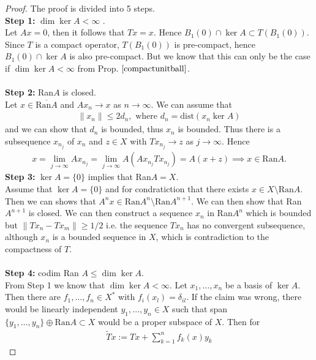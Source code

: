 \documentclass[11pt,a4paper]{article}
\theoremstyle{definition}
\begin{document}
\begin{proof}
The proof is divided into 5 steps. 
\\
\textbf{Step 1:} $\dim \ker A < \infty$ . \\
Let $Ax=0$, then it follows that $Tx=x$. Hence $B_1(0) \cap \ker A \subset T(B_1(0))$. Since $T$ is a compact operator, $T(B_1(0))$ is pre-compact, hence $B_1(0) \cap \ker A$ is also pre-compact. But we know that this can only be the case if $\dim \ker A < \infty$ from Prop. $\ref{compactunitball}$. 
\\\\
\textbf{Step 2:} Ran$A$ is closed.\\
Let $x \in \overline{\text{Ran}A}$ and $Ax_n \to x$ as $n \to \infty$. We can assume that
\begin{align*}
\| x_n \| \leq 2 d_n, \text{ where } d_n = \text{dist}(x_n \ker A)
\end{align*}
and we can show that $d_n$ is bounded, thus $x_n$ is bounded. Thus there is a subsequence $x_{n_j}$ of $x_n$ and $z \in X$ with $Tx_{n_j} \to z$ as $j \to \infty$. Hence 
\begin{align*}
x = \lim_{j \to \infty} Ax_{n_j} = \lim_{j \to \infty} A(Ax_{n_j} Tx_{n_j}) = A(x + z) \implies x \in \text{Ran}A. 
\end{align*}
\textbf{Step 3:} $\ker A = \lbrace 0 \rbrace$ implies that Ran$A=X$. \\
Assume that $\ker A= \lbrace 0 \rbrace$ and for condratiction that there exists $x \in X \setminus \text{Ran}A$. Then we can shows that $A^nx \in \text{Ran}A^n \setminus \text{Ran}A^{n+1}$. We can then show that Ran$A^{n+1}$ is closed. We can then construct a sequence $x_n$ in Ran$A^n$ which is bounded but $\| Tx_n -Tx_m\| \geq 1/2$ i.e. the sequence $Tx_n$ has no convergent subsequence, although $x_n$ is a bounded sequence in $X$, which is contradiction to the compactness of $T$.\\
\\
\textbf{Step 4:} codim Ran $A \leq \dim \ker A$. \\
From Step 1 we know that $\dim \ker A < \infty$. Let $x_1, \dots , x_n$ be a basis of $\ker A$. Then there are $f_1, \dots , f_n \in X^*$ with $f_i(x_l) = \delta_{il}$. If the claim was wrong, there would be linearly independent $y_1, \dots , y_n \in X$ such that span$\lbrace y_1, \dots , y_n \rbrace \oplus \text{Ran}A \subset X$ would be a proper subspace of $X$. Then for
\begin{align*}
\tilde{T}x:= Tx + \sum_{k=1}^n f_k(x)y_k
\end{align*}

\end{proof}
\end{document}
